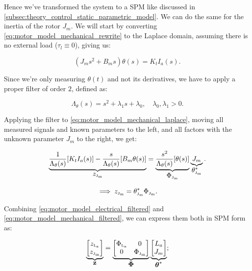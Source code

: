Hence we've transformed the system to a SPM like discussed in \cref{subsec:theory_control_static_parametric_model}. We can do the same for the inertia of the rotor $J_m$. We will start by converting \cref{eq:motor_model_mechanical_rewrite} to the Laplace domain, assuming there is no external load ($\tau_l \equiv 0$), giving us:

\begin{equation}
    \label{eq:motor_model_mechanical_laplace}
    (J_m s^2 + B_m s) \theta(s) = K_t I_a(s).
\end{equation}

Since we're only measuring $\theta(t)$ and not its derivatives, we have to apply a proper filter of order $2$, defined as:

\begin{equation}
    \label{eq:filter_angle}
    \Lambda_{\theta}(s) = s^2 + \lambda_1 s + \lambda_0, \quad \lambda_0, \lambda_1 > 0.
\end{equation}

Applying the filter to \cref{eq:motor_model_mechanical_laplace}, moving all measured signals and known parameters to the left, and all factors with the unknown parameter $J_m$ to the right, we get:

\begin{equation}
    \label{eq:motor_model_mechanical_filtered}
     \underbrace{\frac{1}{\Lambda_{\theta}(s)} [K_t I_a(s)] - \frac{s}{\Lambda_{\theta}(s)} [B_m \theta(s)]}_{\textstyle z_{{\scriptscriptstyle\mathrm{J_m}}}} = \underbrace{\frac{s^2}{\Lambda_{\theta}(s)} [\theta(s)]}_{\textstyle \Phi_{{\scriptscriptstyle\mathrm{J_m}}}} \underbrace{J_m}_{\textstyle \theta^*_{{\scriptscriptstyle\mathrm{J_m}}}}.
\end{equation}

\begin{equation*}
    \implies z_{{\scriptscriptstyle\mathrm{J_m}}} = \theta^*_{{\scriptscriptstyle\mathrm{J_m}}} \Phi_{{\scriptscriptstyle\mathrm{J_m}}}.
\end{equation*}

Combining \cref{eq:motor_model_electrical_filtered} and \cref{eq:motor_model_mechanical_filtered}, we can express them both in SPM form as:

\begin{equation}
    \label{eq:modelling_SPM_combined}
    \underbrace{
    \begin{bmatrix}
        z_{{\scriptscriptstyle\mathrm{L_a}}} \\
        z_{{\scriptscriptstyle\mathrm{J_m}}}
    \end{bmatrix}}_{\textstyle{\mathbf{z}}}
    =
    \underbrace{
    \begin{bmatrix}
        \Phi_{{\scriptscriptstyle\mathrm{L_a}}} & 0 \\
        0 & \Phi_{{\scriptscriptstyle\mathrm{J_m}}}
    \end{bmatrix}}_{\textstyle{\boldsymbol{\Phi}}}
    \underbrace{
    \begin{bmatrix}
        L_a \\
        J_m
    \end{bmatrix}}_{\textstyle{\boldsymbol{\theta}^*}};
\end{equation}

